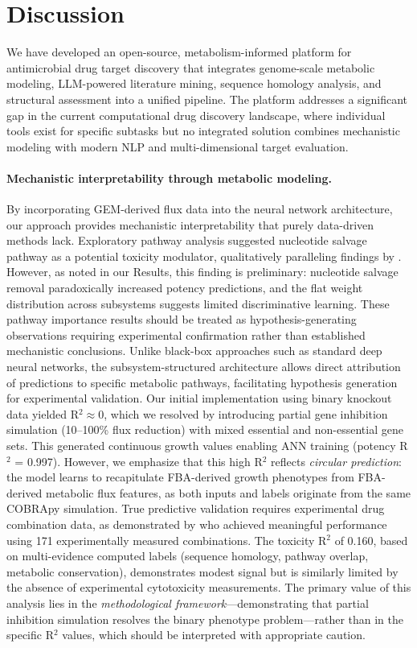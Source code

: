 \documentclass[12pt,a4paper]{article}
\begin{document}
\section{Discussion}

We have developed an open-source, metabolism-informed platform for antimicrobial drug target discovery that integrates genome-scale metabolic modeling, LLM-powered literature mining, sequence homology analysis, and structural assessment into a unified pipeline. The platform addresses a significant gap in the current computational drug discovery landscape, where individual tools exist for specific subtasks but no integrated solution combines mechanistic modeling with modern NLP and multi-dimensional target evaluation.

\paragraph{Mechanistic interpretability through metabolic modeling.}
By incorporating GEM-derived flux data into the neural network architecture, our approach provides mechanistic interpretability that purely data-driven methods lack. Exploratory pathway analysis suggested nucleotide salvage pathway as a potential toxicity modulator, qualitatively paralleling findings by \citet{arora2026}. However, as noted in our Results, this finding is preliminary: nucleotide salvage removal paradoxically increased potency predictions, and the flat weight distribution across subsystems suggests limited discriminative learning. These pathway importance results should be treated as hypothesis-generating observations requiring experimental confirmation rather than established mechanistic conclusions. Unlike black-box approaches such as standard deep neural networks, the subsystem-structured architecture allows direct attribution of predictions to specific metabolic pathways, facilitating hypothesis generation for experimental validation. Our initial implementation using binary knockout data yielded R$^2 \approx 0$, which we resolved by introducing partial gene inhibition simulation (10--100\% flux reduction) with mixed essential and non-essential gene sets. This generated continuous growth values enabling ANN training (potency R$^2$ = 0.997). However, we emphasize that this high R$^2$ reflects \textit{circular prediction}: the model learns to recapitulate FBA-derived growth phenotypes from FBA-derived metabolic flux features, as both inputs and labels originate from the same COBRApy simulation. True predictive validation requires experimental drug combination data, as demonstrated by \citet{arora2026} who achieved meaningful performance using 171 experimentally measured combinations. The toxicity R$^2$ of 0.160, based on multi-evidence computed labels (sequence homology, pathway overlap, metabolic conservation), demonstrates modest signal but is similarly limited by the absence of experimental cytotoxicity measurements. The primary value of this analysis lies in the \textit{methodological framework}---demonstrating that partial inhibition simulation resolves the binary phenotype problem---rather than in the specific R$^2$ values, which should be interpreted with appropriate caution.
\end{document}
